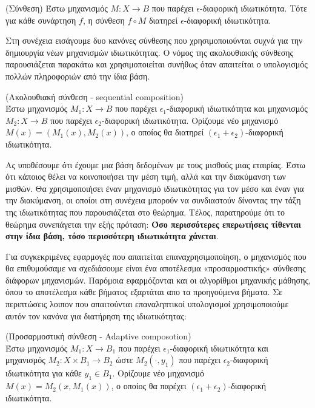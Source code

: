 \begin{theorem}\label{ak}(Σύνθεση)
 Έστω μηχανισμός $M:X\longrightarrow  B $ που παρέχει $\epsilon$-διαφορική ιδιωτικότητα. Τότε για κάθε συνάρτηση $f$, η σύνθεση $f\circ M$ διατηρεί $\epsilon$-διαφορική ιδιωτικότητα.
\end{theorem}

Στη συνέχεια εισάγουμε δυο κανόνες σύνθεσης που χρησιμοποιούνται συχνά για την δημιουργία νέων μηχανισμών ιδιωτικότητας. Ο νόμος της ακολουθιακής σύνθεσης παρουσιάζεται παρακάτω και χρησιμοποιείται συνήθως όταν απαιτείται ο υπολογισμός πολλών πληροφοριών από την ίδια βάση.


\begin{theorem} (Ακολουθιακή σύνθεση - \textlatin{sequential composition})\\
 Έστω μηχανισμός $M_1:X\longrightarrow  B $ που παρέχει $\epsilon_1$-διαφορική ιδιωτικότητα και μηχανισμός $M_2:X\longrightarrow  B $ που παρέχει $\epsilon_2$-διαφορική ιδιωτικότητα. Ορίζουμε νέο μηχανισμό $M(x)=(M_1(x),M_2(x))$, ο οποίος θα διατηρεί $(\epsilon_1+\epsilon_2)$-διαφορική ιδιωτικότητα.
\end{theorem}

Ας υποθέσουμε ότι έχουμε μια βάση δεδομένων με τους μισθούς μιας εταιρίας. Έστω ότι κάποιος θέλει να κοινοποιήσει την μέση τιμή, αλλά και την διακύμανση των μισθών. Θα χρησιμοποιήσει έναν μηχανισμό ιδιωτικότητας για τον μέσο και έναν για την διακύμανση, οι οποίοι στη συνέχεια μπορούν να συνδιαστούν δίνοντας την τάξη της ιδιωτικότητας που παρουσιάζεται στο θεώρημα. Τέλος, παρατηρούμε ότι το θεώρημα συνεπάγεται την εξής πρόταση:\textbf{ Όσο περισσότερες επερωτήσεις τίθενται στην ίδια βάση, τόσο περισσότερη ιδιωτικότητα χάνεται}.

Για συγκεκριμένες εφαρμογές που απαιτείται επαναχρησιμοποίηση, ο μηχανισμός που θα επιθυμούσαμε να σχεδιάσουμε είναι ένα αποτέλεσμα «προσαρμοστικής» σύνθεσης διάφορων μηχανισμών. Παρόμοια εφαρμόζονται και οι αλγορίθμοι μηχανικής μάθησης, όπου το αποτέλεσμα κάθε βήματος εξαρτάται απο τα προηγούμενα βήματα. Σε περιπτώσεις λοιπον που απαιτούνται επαναληπτικοί υπολογισμοί χρησιμοποιούμε αυτόν τον κανόνα για διατήρηση της ιδιωτικότητας:

\begin{theorem} (Προσαρμοστική σύνθεση - \textlatin{Adaptive composotion})\\
 Έστω μηχανισμός $M_1:X\longrightarrow  B_1 $ που παρέχει $\epsilon_1$-διαφορική ιδιωτικότητα και μηχανισμός $M_2:X\times B_1\longrightarrow  B_2 $ ώστε $M_2(\cdot, y_1)$ που παρέχει $\epsilon_2$-διαφορική ιδιωτικότητα για κάθε $y_1 \in B_1$. Ορίζουμε νέο μηχανισμό $M(x)=M_2(x,M_1(x))$, ο οποίος θα παρέχει $(\epsilon_1+\epsilon_2)$-διαφορική ιδιωτικότητα.
\end{theorem}

